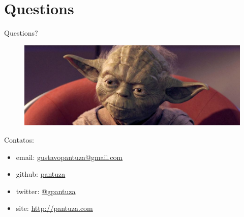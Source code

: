 \section{Questions}

\begin{frame}
  {Questions?}

\begin{figure}[h]\vspace*{-1cm}
    \centering
    \includegraphics[scale=0.3,width=\linewidth]{img/questions}
\end{figure}

Contatos:

\begin{itemize}
\item email: \href{mailto:gustavopantuza@gmail.com}{gustavopantuza@gmail.com}
\item github: \href{http://github.com/pantuza}{pantuza}
\item twitter: \href{http://twitter.com/gpantuza}{@gpantuza}
\item site: \href{http://pantuza.com}{http://pantuza.com}
\end{itemize}

\end{frame}

